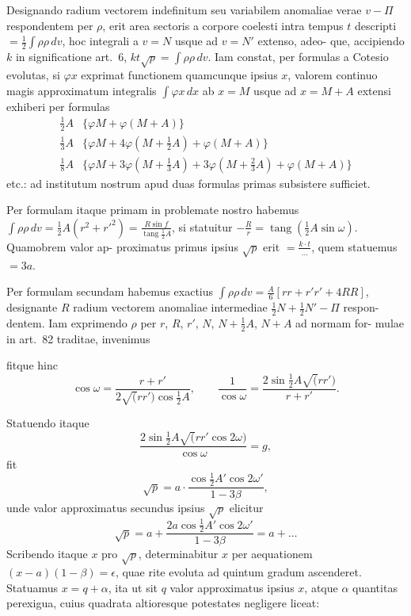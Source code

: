 \documentclass[12pt,a4paper]{article}
\newcommand{\tang}{\mathop{\mathrm{tang}}\nolimits}
\begin{document}
Designando radium vectorem indefinitum seu variabilem anomaliae verae
$v - \Pi$ respondentem per $\rho$, erit area sectoris a corpore coelesti intra tempus
$t$ descripti $= \frac{1}{2}\int\rho\rho\,dv$, hoc integrali a $v = N$ usque ad $v = N'$ extenso, adeo-
que, accipiendo $k$ in significatione art.~6, $kt\surd p = \int\rho\rho\,dv$. Iam constat, per
formulas a Cotesio evolutas, si $\varphi x$ exprimat functionem quamcunque ipsius $x$,
valorem continuo magis approximatum integralis $\int\varphi x\,dx$ ab $x = M$ usque ad
$x = M + A$ extensi exhiberi per formulas
\begin{align*}
\tfrac{1}{2}A&\{\varphi M + \varphi(M + A)\} \\
\tfrac{1}{3}A&\{\varphi M + 4\varphi(M + \tfrac{1}{2}A) + \varphi(M + A)\} \\
\tfrac{1}{8}A&\{\varphi M + 3\varphi(M + \tfrac{1}{3}A) + 3\varphi(M + \tfrac{2}{3}A) + \varphi(M + A)\}
\end{align*}
etc.: ad institutum nostrum apud duas formulas primas subsistere sufficiet.

Per formulam itaque primam in problemate nostro habemus $\int\rho\rho\,dv =
\tfrac{1}{2}A(r^2 + r'^2) = \frac{R\sin f}{\tang\frac{1}{2}A}$, si statuitur $-\frac{R}{r} = \tang(\tfrac{1}{2}A\sin\omega)$. Quamobrem valor ap-
proximatus primus ipsius $\surd p$ erit $= \frac{k\cdot t}{\dots}$, quem statuemus $= 3a$.

Per formulam secundam habemus exactius $\int\rho\rho\,dv = \frac{A}{6}[rr + r'r' + 4RR]$,
designante $R$ radium vectorem anomaliae intermediae $\tfrac{1}{2}N + \tfrac{1}{2}N' - \Pi$ respon-
dentem. Iam exprimendo $\rho$ per $r$, $R$, $r'$, $N$, $N + \tfrac{1}{2}A$, $N + A$ ad normam for-
mulae in art.~82 traditae, invenimus

fitque hinc
\begin{equation}
\cos\omega = \frac{r + r'}{2\surd(rr')\cos\tfrac{1}{2}A}, \qquad
\frac{1}{\cos\omega} = \frac{2\sin\tfrac{1}{2}A\surd(rr')}{r + r'}.
\end{equation}

Statuendo itaque
\[
\frac{2\sin\tfrac{1}{2}A\surd(rr'\cos 2\omega)}{\cos\omega} = g,
\]
fit
\[
\sqrt{p} = a\cdot\frac{\cos\tfrac{1}{2}A'\cos 2\omega'}{1 - 3\beta},
\]
unde valor approximatus secundus ipsius $\surd p$ elicitur
\[
\surd p = a + \frac{2a\cos\frac{1}{2}A'\cos 2\omega'}{1 - 3\beta} = a + \dots
\]
Scribendo itaque $x$ pro $\surd p$, determinabitur
$x$ per aequationem $(x - a)(1 - \beta) = \epsilon$, quae rite evoluta ad quintum gradum
ascenderet. Statuamus $x = q + \alpha$, ita ut sit $q$ valor approximatus ipsius $x$,
atque $\alpha$ quantitas perexigua, cuius quadrata altioresque potestates negligere
liceat:
\end{document}
